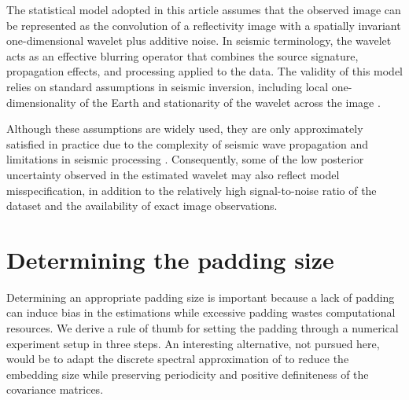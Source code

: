 \documentclass[12pt]{article}
\begin{document}

The statistical model adopted in this article assumes that the observed image can be represented as the convolution of a reflectivity image with a spatially invariant one-dimensional wavelet plus additive noise. In seismic terminology, the wavelet acts as an effective blurring operator that combines the source signature, propagation effects, and processing applied to the data. The validity of this model relies on standard assumptions in seismic inversion, including local one-dimensionality of the Earth and stationarity of the wavelet across the image \citep{BulandOmre2003a,BulandOmre2003b}.

Although these assumptions are widely used, they are only approximately satisfied in practice due to the complexity of seismic wave propagation and limitations in seismic processing \citep{MarfurtAlves2015}. Consequently, some of the low posterior uncertainty observed in the estimated wavelet may also reflect model misspecification, in addition to the relatively high signal-to-noise ratio of the dataset and the availability of exact image observations.



\section{Determining the padding size} \label{sec:margins}
Determining an appropriate padding size is important because a lack of padding can induce bias in the estimations while excessive padding wastes computational resources. 
We derive a rule of thumb for setting the padding through a numerical experiment setup in three steps.
An interesting alternative, not pursued here, would be to adapt the discrete spectral approximation of \citet{guinness2017circulant} to reduce the embedding size while preserving periodicity and positive definiteness of the covariance matrices.
\end{document}
